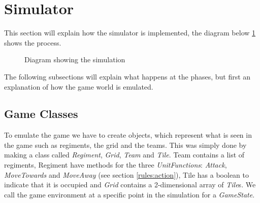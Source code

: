 \section{Simulator}
	This section will explain how the simulator is implemented, the diagram below \ref{fig:sim} shows the process.
\begin{figure}[H]
\center
{}
\label{fig:sim}
\caption{Diagram showing the simulation}
\end{figure}

The following subsections will explain what happens at the phases, but first an explanation of how the game world is emulated.
\subsection{Game Classes}
	To emulate the game we have to create objects, which represent what is seen in the game such as regiments, the grid and the teams.
	This was simply done by making a class called {\it Regiment}, {\it Grid}, {\it Team} and {\it Tile}. 
	Team contains a list of regiments, Regiment have methods for the three {\it UnitFunctions}: {\it Attack}, 
	{\it MoveTowards} and {\it MoveAway} (see section \ref{rules:action}), Tile has a boolean to indicate that it is occupied 
	and \textit{Grid} contains a 2-dimensional array of {\it Tile}s. We call the game environment at a specific point in the simulation for a {\it GameState}. 

